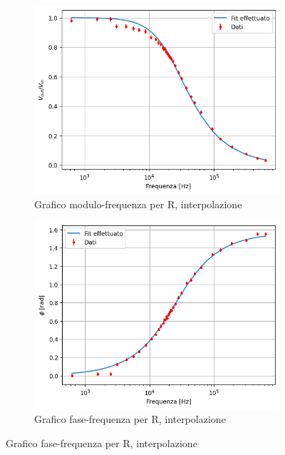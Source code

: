 \documentclass[letterpaper,12pt]{article}
\begin{document}
\begin{figure}[p] %
    \centering
    \begin{subfigure}[b]{0.45\textwidth}
        \centering
        \includegraphics[width=\textwidth]{RL_R_modulo.png}
        \caption{Grafico modulo-frequenza per R, interpolazione}
        \label{fig:RL_R_modulo}
    \end{subfigure}
    \hfill
    \begin{subfigure}[b]{0.45\textwidth}
        \centering
        \includegraphics[width=\textwidth]{RL_R_fase.png}
        \caption{Grafico fase-frequenza per R, interpolazione}
        \label{fig:RL_R_fase}
    \end{subfigure}
    

\end{figure}
\end{document}
